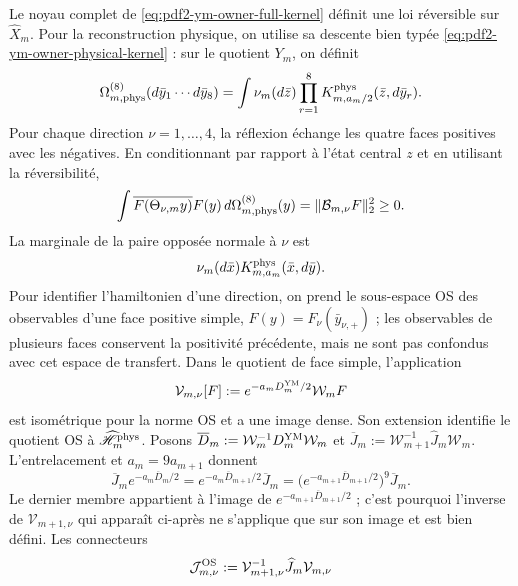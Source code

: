 Le noyau complet de \eqref{eq:pdf2-ym-owner-full-kernel} définit une loi réversible sur $\widehat X_m$. Pour la reconstruction physique, on utilise sa descente bien typée \eqref{eq:pdf2-ym-owner-physical-kernel} : sur le quotient $Y_m$, on définit
\begin{equation}\label{eq:pdf2-ym-owner-eight-face-law}
 \Omega_{m,{\rm phys}}^{(8)}(d\bar y_1\cdots d\bar y_8)
 =\int\nu_m(d\bar z)
  \prod_{r=1}^8K_{m,a_m/2}^{\rm phys}(\bar z,d\bar y_r).
\end{equation}
Pour chaque direction $\nu=1,\ldots,4$, la réflexion échange les quatre faces
positives avec les négatives. En conditionnant par rapport à l’état central $z$ et en utilisant
la réversibilité,
\begin{equation}\label{eq:pdf2-ym-owner-four-os}
 \int\overline{F(\Theta_{\nu,m}y)}F(y)\,
 d\Omega_{m,{\rm phys}}^{(8)}(y)
 =\|\mathcal B_{m,\nu}F\|_2^2\ge0.
\end{equation}
La marginale de la paire opposée normale à $\nu$ est
\begin{equation}\label{eq:pdf2-ym-owner-os-marginal}
 \nu_m(d\bar x)K_{m,a_m}^{\rm phys}(\bar x,d\bar y).
\end{equation}
Pour identifier l'hamiltonien d'une direction, on prend le sous-espace OS des observables d'une face positive simple, $F(y)=F_\nu(\bar y_{\nu,+})$ ; les observables de plusieurs faces conservent la positivité précédente, mais ne sont pas confondus avec cet espace de transfert. Dans le quotient de face simple, l'application
\begin{equation}\label{eq:pdf2-ym-owner-os-unitary}
 \mathcal V_{m,\nu}[F]
 :=e^{-a_mD_m^{\rm YM}/2}\mathcal W_mF
\end{equation}
est isométrique pour la norme OS et a une image dense. Son extension identifie le
quotient OS à $\widehat{\mathscr H}_m^{\rm phys}$. Posons
$\overline D_m:=\mathcal W_m^{-1}D_m^{\rm YM}\mathcal W_m$ et
$\overline J_m:=\mathcal W_{m+1}^{-1}\widehat J_m\mathcal W_m$.
L’entrelacement et $a_m=9a_{m+1}$ donnent
\begin{equation}\label{eq:pdf2-ym-owner-os-range-inclusion}
 \overline J_me^{-a_m\overline D_m/2}
 =e^{-a_m\overline D_{m+1}/2}\overline J_m
 =\bigl(e^{-a_{m+1}\overline D_{m+1}/2}\bigr)^9\overline J_m.
\end{equation}
Le dernier membre appartient à l’image de
$e^{-a_{m+1}\overline D_{m+1}/2}$ ; c’est pourquoi l’inverse de $\mathcal V_{m+1,\nu}$
qui apparaît ci-après ne s’applique que sur son image et est bien défini. Les
connecteurs
\begin{equation}\label{eq:pdf2-ym-owner-os-connectors}
 \mathcal J_{m,\nu}^{\rm OS}
 :=\mathcal V_{m+1,\nu}^{-1}\widehat J_m\mathcal V_{m,\nu}
\end{equation}
